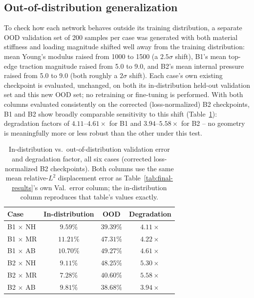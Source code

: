 \documentclass[final,5p,times]{elsarticle}
\begin{document}
\subsection{Out-of-distribution generalization}
To check how each network behaves outside its training distribution, a
separate OOD validation set of 200 samples per case was generated with
both material stiffness and loading magnitude shifted well away from the
training distribution: mean Young's modulus raised from 1000 to 1500 (a
$2.5\sigma$ shift), B1's mean top-edge traction magnitude raised from 5.0
to 9.0, and B2's mean internal pressure raised from 5.0 to 9.0 (both
roughly a $2\sigma$ shift). Each case's own existing checkpoint is
evaluated, unchanged, on both its in-distribution held-out validation set
and this new OOD set; no retraining or fine-tuning is performed. With both
columns evaluated consistently on the corrected (loss-normalized) B2
checkpoints, B1 and B2 show broadly comparable sensitivity to this shift
(Table~\ref{tab:ood-six-cases}): degradation factors of $4.11$--$4.61\times$
for B1 and $3.94$--$5.58\times$ for B2 -- no geometry is meaningfully more
or less robust than the other under this test.

\begin{table}[h]
\centering
\caption{In-distribution vs.\ out-of-distribution validation error and
  degradation factor, all six cases (corrected loss-normalized B2
  checkpoints). Both columns use the same mean relative-$L^2$
  displacement error as Table~\ref{tab:final-results}'s own Val.\ error
  column; the in-distribution column reproduces that table's values
  exactly.}
\label{tab:ood-six-cases}
\small
\begin{tabular}{lccc}
\toprule
Case & In-distribution & OOD & Degradation \\
\midrule
B1 $\times$ NH & $9.59\%$  & $39.39\%$ & $4.11\times$ \\
B1 $\times$ MR & $11.21\%$ & $47.31\%$ & $4.22\times$ \\
B1 $\times$ AB & $10.70\%$ & $49.27\%$ & $4.61\times$ \\
B2 $\times$ NH & $9.11\%$  & $48.25\%$ & $5.30\times$ \\
B2 $\times$ MR & $7.28\%$  & $40.60\%$ & $5.58\times$ \\
B2 $\times$ AB & $9.81\%$  & $38.68\%$ & $3.94\times$ \\
\bottomrule
\end{tabular}
\end{table}
\end{document}
